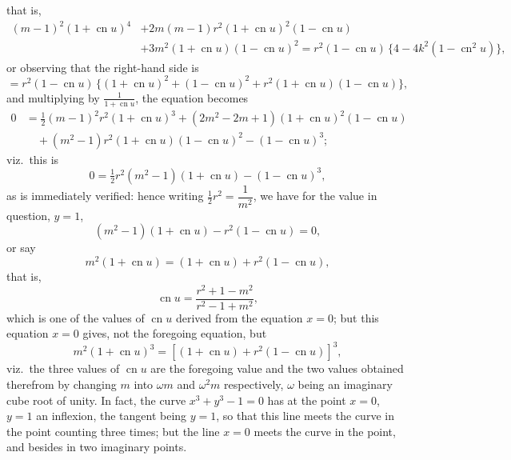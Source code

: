 \documentclass[11pt,a4paper]{article}
\providecommand{\textsc}[1]{{\scshape #1}}
\begin{document}
\fancyhead[L]{\small 804]}
\fancyhead[C]{\small\textsc{of the equation $x^{3} + y^{3} - 1 = 0$.}}

\thispagestyle{plain}
\noindent that is,
\[
\begin{aligned}
(m - 1)^{2}(1 + \operatorname{cn} u)^{4} &+ 2m(m - 1)r^{2}(1 + \operatorname{cn} u)^{2}(1 - \operatorname{cn} u)\\
 &+ 3m^{2}(1 + \operatorname{cn} u)(1 - \operatorname{cn} u)^{2} = r^{2}(1 - \operatorname{cn} u)\,\{4 - 4k^{2}(1 - \operatorname{cn}^{2} u)\},
\end{aligned}
\]
or observing that the right-hand side is
\[
= r^{2}(1 - \operatorname{cn} u)\,\{(1 + \operatorname{cn} u)^{2} + (1 - \operatorname{cn} u)^{2} + r^{2}(1 + \operatorname{cn} u)(1 - \operatorname{cn} u)\},
\]
and multiplying by $\tfrac{1}{1 + \operatorname{cn} u}$, the equation becomes
\[
\begin{aligned}
0 &= \tfrac{1}{2}(m - 1)^{2}r^{2}(1 + \operatorname{cn} u)^{3} + (2m^{2} - 2m + 1)(1 + \operatorname{cn} u)^{2}(1 - \operatorname{cn} u)\\
  &\quad + (m^{2} - 1)r^{2}(1 + \operatorname{cn} u)(1 - \operatorname{cn} u)^{2} - (1 - \operatorname{cn} u)^{3};
\end{aligned}
\]
viz.\ this is
\[
0 = \tfrac{1}{2}r^{2}(m^{2} - 1)(1 + \operatorname{cn} u) - (1 - \operatorname{cn} u)^{3},
\]
as is immediately verified: hence writing $\tfrac{1}{2}r^{2} = \dfrac{1}{m^{2}}$, we have for the value in question, $y = 1$,
\[
(m^{2} - 1)(1 + \operatorname{cn} u) - r^{2}(1 - \operatorname{cn} u) = 0,
\]
or say
\[
m^{2}(1 + \operatorname{cn} u) = (1 + \operatorname{cn} u) + r^{2}(1 - \operatorname{cn} u),
\]
that is,
\[
\operatorname{cn} u = \frac{r^{2} + 1 - m^{2}}{r^{2} - 1 + m^{2}},
\]
which is one of the values of $\operatorname{cn} u$ derived from the equation $x = 0$; but this equation $x = 0$ gives, not the foregoing equation, but
\[
m^{2}(1 + \operatorname{cn} u)^{3} = [(1 + \operatorname{cn} u) + r^{2}(1 - \operatorname{cn} u)]^{3},
\]
viz.\ the three values of $\operatorname{cn} u$ are the foregoing value and the two values obtained therefrom by changing $m$ into $\omega m$ and $\omega^{2} m$ respectively, $\omega$ being an imaginary cube root of unity.  In fact, the curve $x^{3} + y^{3} - 1 = 0$ has at the point $x = 0$, $y = 1$ an inflexion, the tangent being $y = 1$, so that this line meets the curve in the point counting three times; but the line $x = 0$ meets the curve in the point, and besides in two imaginary points.
\clearpage
\end{document}
